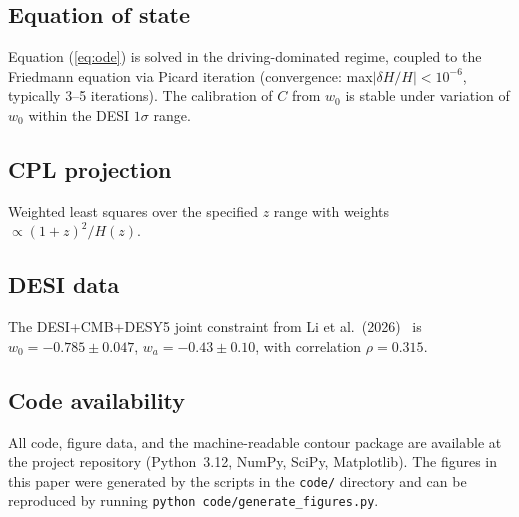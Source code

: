 \documentclass[12pt,a4paper]{article}
\begin{document}
\subsection*{Equation of state}
Equation (\ref{eq:ode}) is solved in the driving-dominated regime, coupled to the Friedmann equation via Picard iteration (convergence: max$|\delta H/H|<10^{-6}$, typically 3--5 iterations). The calibration of $C$ from $w_0$ is stable under variation of $w_0$ within the DESI $1\sigma$ range.

\subsection*{CPL projection}
Weighted least squares over the specified $z$ range with weights $\propto(1+z)^2/H(z)$.

\subsection*{DESI data}
The DESI+CMB+DESY5 joint constraint from Li et al.\ (2026)~\cite{li2026} is $w_0=-0.785\pm0.047$, $w_a=-0.43\pm0.10$, with correlation $\rho=0.315$.

\subsection*{Code availability}
All code, figure data, and the machine-readable contour package are available at the project repository (Python~3.12, NumPy, SciPy, Matplotlib). The figures in this paper were generated by the scripts in the \texttt{code/} directory and can be reproduced by running \texttt{python code/generate\_figures.py}.
\end{document}
